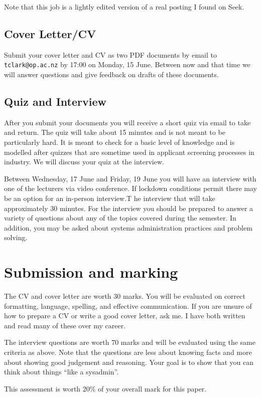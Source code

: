 \documentclass{article}   	%
\begin{document}
Note that this job is a lightly edited version of a real posting I found on Seek.

\subsection{Cover Letter/CV}

Submit your cover letter and CV as two PDF documents by email to \texttt{tclark@op.ac.nz} by 17:00 on Monday, 15 June.  Between now and that time we will answer questions and give feedback on drafts of these documents.  

\subsection{Quiz and Interview}
After you submit your documents you will receive a short quiz via email to take and return. The quiz will take about 15 minutes and is not meant to be particularly hard. It is meant to check for a basic level of knowledge and is modelled after quizzes that are sometime used in applicant screening processes in industry. We will discuss your quiz at the interview.
  
Between Wednesday, 17 June and Friday, 19 June you will have an interview with one of the lecturers via video conference. If lockdown conditions permit there may be an option for an in-person interview.T he interview that will take approximately 30 minutes. For the interview you should be prepared to answer a variety of questions about any of the topics covered during the semester. In addition, you may be asked about systems administration practices and problem solving.

\newpage

\section{Submission and marking}

The CV and cover letter are worth 30 marks. You will be evaluated on correct formatting, language, spelling, and effective communication. If you are unsure of how to prepare a CV or write a good cover letter, ask me. I have both written and read many of these over my career. 

The interview questions are worth 70 marks and will be evaluated using the same criteria as above. Note that the questions are less about knowing facts and more about showing good judgement and reasoning. Your goal is to show that you can think about things ``like a sysadmin''.

This assessment is worth 20\% of your overall mark for this paper.
 
\end{document}
